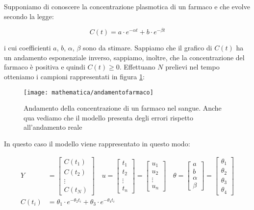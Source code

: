 \begin{esempio} %
Supponiamo di conoscere la concentrazione plasmotica di un farmaco e che evolve secondo la legge:

  \[ C(t)=a \cdot e^{-\alpha t}+b \cdot e^{-\beta t} \]
  
i cui coefficienti $a$, $b$, $\alpha$, $\beta$ sono da stimare.
Sappiamo che il grafico di $C(t)$ ha un andamento esponenziale inverso, sappiamo, inoltre, che la concentrazione del farmaco è positiva e quindi $C(t)\geq 0$. Effettuano $N$ prelievi nel tempo otteniamo i campioni rappresentati in figura \ref{fig:concfarmaco}:

\begin{figure}[htbp]
  \centering
  \texttt{[image: mathematica/andamentofarmaco]}
  \caption{Andamento della concentrazione di un farmaco nel sangue. Anche qua vediamo che il modello presenta degli errori rispetto all'andamento reale\label{fig:concfarmaco}}
\end{figure}

In questo caso il modello viene rappresentato in questo modo:

  \begin{align*}
    Y&=\begin{bmatrix} C(t_1)\\C(t_2)\\ \vdots \\ C(t_N) \end{bmatrix}\quad u=\begin{bmatrix} t_1 \\ t_2 \\ \vdots \\t_n \end{bmatrix}=\begin{bmatrix} u_1 \\ u_2 \\ \vdots \\u_n \end{bmatrix} \quad \theta=\begin{bmatrix} a \\ b \\ \alpha \\ \beta \end{bmatrix}=\begin{bmatrix} \theta_1 \\ \theta_2 \\ \theta_3 \\ \theta_4 \end{bmatrix}\\
    C(t_i)&=\theta_1 \cdot e^{-\theta_2 t_i} + \theta_3 \cdot e^{-\theta_4 t_i}
  \end{align*}
  

\end{esempio}
